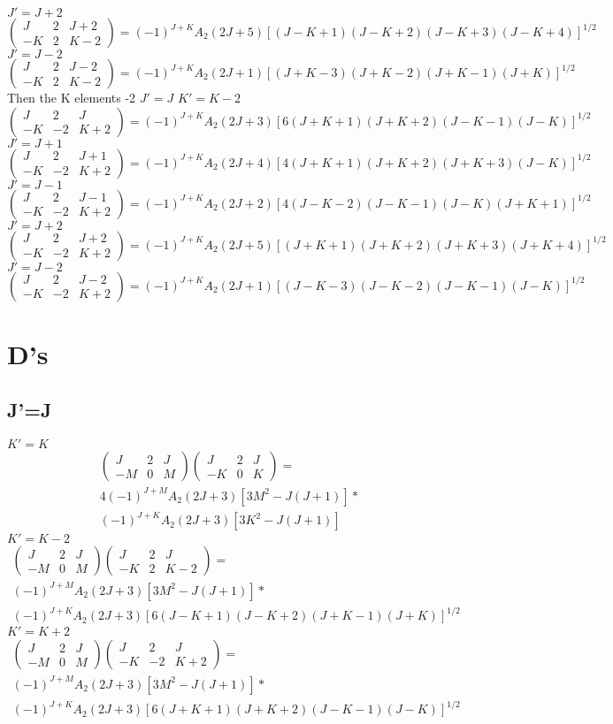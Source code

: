 \documentclass{article}
\newcommand{\wigner}[6]{\begin{pmatrix}{#1}&{#2}&{#3}\\{#4}&{#5}&{#6}\end{pmatrix}}
\begin{document}
$J'=J+2$
\begin{equation*}
  \wigner{J}{2}{J+2}{-K}{2}{K-2}=(-1)^{J+K}A_2(2J+5)[(J-K+1)(J-K+2)(J-K+3)(J-K+4)]^{1/2}
\end{equation*}
$J'=J-2$
\begin{equation*}
  \wigner{J}{2}{J-2}{-K}{2}{K-2}=(-1)^{J+K}A_2(2J+1)[(J+K-3)(J+K-2)(J+K-1)(J+K)]^{1/2}
\end{equation*}
Then the K elements -2
 $J'=J$ $K'=K-2$
\begin{equation*}
  \wigner{J}{2}{J}{-K}{-2}{K+2}=(-1)^{J+K}A_2(2J+3)[6(J+K+1)(J+K+2)(J-K-1)(J-K)]^{1/2}
\end{equation*}
$J'=J+1$
\begin{equation*}
  \wigner{J}{2}{J+1}{-K}{-2}{K+2}=(-1)^{J+K}A_2(2J+4)[4(J+K+1)(J+K+2)(J+K+3)(J-K)]^{1/2}
\end{equation*}
$J'=J-1$
\begin{equation*}
  \wigner{J}{2}{J-1}{-K}{-2}{K+2}=(-1)^{J+K}A_2(2J+2)[4(J-K-2)(J-K-1)(J-K)(J+K+1)]^{1/2}
\end{equation*}
$J'=J+2$
\begin{equation*}
  \wigner{J}{2}{J+2}{-K}{-2}{K+2}=(-1)^{J+K}A_2(2J+5)[(J+K+1)(J+K+2)(J+K+3)(J+K+4)]^{1/2}
\end{equation*}
$J'=J-2$
\begin{equation*}
  \wigner{J}{2}{J-2}{-K}{-2}{K+2}=(-1)^{J+K}A_2(2J+1)[(J-K-3)(J-K-2)(J-K-1)(J-K)]^{1/2}
\end{equation*}
\section{D's}
\subsection{J'=J}
$K'=K$
\begin{align*}
\wigner{J}{2}{J}{-M}{0}{M}\wigner{J}{2}{J}{-K}{0}{K}=\\4(-1)^{J+M}A_2(2J+3)[3M^2-J(J+1)]*\\(-1)^{J+K}A_2(2J+3)[3K^2-J(J+1)]
\end{align*}
$K'=K-2$
\begin{align*}
\wigner{J}{2}{J}{-M}{0}{M}\wigner{J}{2}{J}{-K}{2}{K-2}=\\(-1)^{J+M}A_2(2J+3)[3M^2-J(J+1)]*\\(-1)^{J+K}A_2(2J+3)[6(J-K+1)(J-K+2)(J+K-1)(J+K)]^{1/2}
\end{align*}
$K'=K+2$
\begin{align*}
\wigner{J}{2}{J}{-M}{0}{M}\wigner{J}{2}{J}{-K}{-2}{K+2}=\\(-1)^{J+M}A_2(2J+3)[3M^2-J(J+1)]*\\(-1)^{J+K}A_2(2J+3)[6(J+K+1)(J+K+2)(J-K-1)(J-K)]^{1/2}
\end{align*}
\newpage
\end{document}
